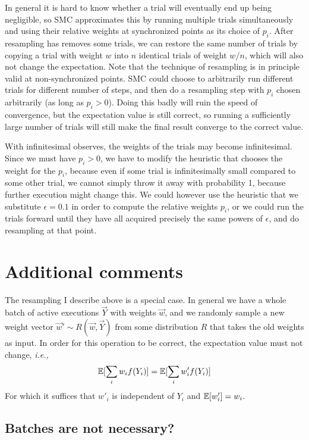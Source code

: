 \documentclass[a4paper, 11pt]{article}
\theoremstyle{definition}
\newcommand{\ie}{\textit{i.e.,}\xspace}
\begin{document}
In general it is hard to know whether a trial will eventually end up being negligible, so SMC approximates this by running multiple trials simultaneously and using their relative weights at synchronized points as its choice of $p_i$. After resampling has removes some trials, we can restore the same number of trials by copying a trial with weight $w$ into $n$ identical trials of weight $w/n$, which will also not change the expectation. Note that the technique of resampling is in principle valid at non-synchronized points. SMC could choose to arbitrarily run different trials for different number of steps, and then do a resampling step with $p_i$ chosen arbitrarily (as long as $p_i > 0$). Doing this badly will ruin the speed of convergence, but the expectation value is still correct, so running a sufficiently large number of trials will still make the final result converge to the correct value.

With infinitesimal observes, the weights of the trials may become infinitesimal. Since we must have $p_i > 0$, we have to modify the heuristic that chooses the weight for the $p_i$, because even if some trial is infinitesimally small compared to some other trial, we cannot simply throw it away with probability 1, because further execution might change this. We could however use the heuristic that we substitute $\epsilon = 0.1$ in order to compute the relative weights $p_i$, or we could run the trials forward until they have all acquired precisely the same powers of $\epsilon$, and do resampling at that point.

\section*{Additional comments}

The resampling I describe above is a special case. In general we have a whole batch of active executions $\vec{Y}$ with weights $\vec{w}$, and we randomly sample a new weight vector $\vec{w}' \sim R(\vec{w},\vec{Y})$ from some distribution $R$ that takes the old weights as input. In order for this operation to be correct, the expectation value must not change, \ie
\begin{align}
  \mathbb{E}[\sum_i w_i f(Y_i)] = \mathbb{E}[\sum_i w'_i f(Y_i)]
\end{align}
For which it suffices that $w'_i$ is independent of $Y_i$ and $\mathbb{E}[w'_i] = w_i$.

\subsection*{Batches are not necessary?}
\end{document}
